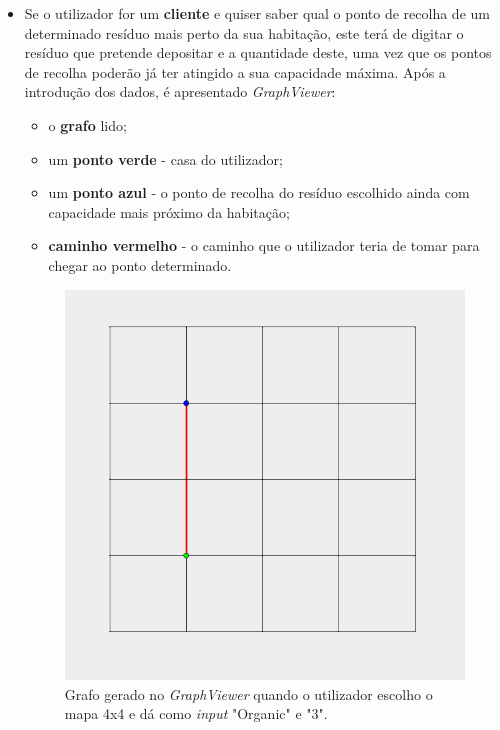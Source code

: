 \documentclass[article, a4paper, 12pt, oneside]{memoir}
\begin{document}
\begin{itemize}
	\item Se o utilizador for um \textbf{cliente} e quiser saber qual o ponto de recolha de um determinado resíduo mais perto da sua habitação, este terá de digitar o resíduo que pretende depositar e a quantidade deste, uma vez que os pontos de recolha poderão já ter atingido a sua capacidade máxima. Após a introdução dos dados, é apresentado \textit{GraphViewer}:
	\begin{itemize}
		\item o \textbf{grafo} lido;
		\item um \textbf{ponto verde} - casa do utilizador;
		\item um \textbf{ponto azul} - o ponto de recolha do resíduo escolhido ainda com capacidade mais próximo da habitação;
		\item \textbf{caminho vermelho} - o caminho que o utilizador teria de tomar para chegar ao ponto determinado. 
	\end{itemize}
	
	\begin{figure}[h!]
  		\centerline{\includegraphics[scale=0.4]{wasteapp_4x4henrique123organic.png}}
  		\caption{Grafo gerado no \textit{GraphViewer} quando o utilizador escolho o mapa 4x4 e dá como \textit{input} "Organic" e "3".}
	\end{figure}
	

\end{itemize}
\end{document}
